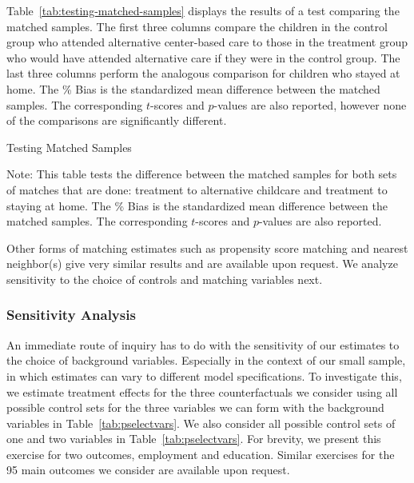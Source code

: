 \noindent Table~\ref{tab:testing-matched-samples} displays the results of a test comparing the matched samples. The first three columns compare the children in the control group who attended alternative center-based care to those in the treatment group who would have attended alternative care if they were in the control group. The last three columns perform the analogous comparison for children who stayed at home. The \% Bias is the standardized mean difference between the matched samples. The corresponding $t$-scores and $p$-values are also reported, however none of the comparisons are significantly different.

\begin{table}[htbp!]
\begin{threeparttable}
\caption{Testing Matched Samples} \label{tab:testing-matched-samples}

\begin{tablenotes}
\item \footnotesize Note: This table tests the difference between the matched samples for both sets of matches that are done: treatment to alternative childcare and treatment to staying at home. The \% Bias is the standardized mean difference between the matched samples. The corresponding $t$-scores and $p$-values are also reported.
\end{tablenotes}
\end{threeparttable}
\end{table}

\noindent Other forms of matching estimates such as propensity score matching and nearest neighbor(s) give very similar results and are available upon request. We analyze sensitivity to the choice of controls and matching variables next.\\

\subsubsection{Sensitivity Analysis} \label{app:senscontrols}

\noindent An immediate route of inquiry has to do with the sensitivity of our estimates to the choice of background variables. Especially in the context of our small sample, in which estimates can vary to different model specifications. To investigate this, we estimate treatment effects for the three counterfactuals we consider using all possible control sets for the three variables we can form with the background variables in Table~\ref{tab:pselectvars}. We also consider all possible control sets of one and two variables in Table~\ref{tab:pselectvars}. For brevity, we present this exercise for two outcomes, employment and education. Similar exercises for the 95 main outcomes we consider are available upon request.\\

